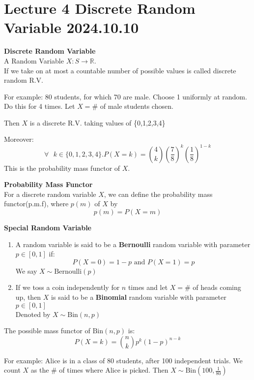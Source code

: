 \documentclass{article}
\begin{document}
\section{Lecture 4 Discrete Random Variable 2024.10.10}

\begin{definition}
    \textbf{Discrete Random Variable}\\
    A Random Variable $ X: S \longrightarrow \mathbb{R}$.\\
    If we take on at most a countable number of possible values is called discrete random R.V.
\end{definition}
For example: 80 students, for which 70 are male. Choose 1 uniformly at random. Do this for 4 times. Let $X = \#$ of male students chosen.

Then $X$ is a discrete R.V. taking values of \{0,1,2,3,4\}

Moreover:
$$\forall \text{ } k \in \{0,1,2,3,4\}. P(X=k) = \binom{4}{k}(\frac{7}{8})^k(\frac{1}{8})^{1-k}$$
This is the probability mass functor of $X$.
\begin{definition}
    \textbf{Probability Mass Functor}\\
    For a discrete random variable $X$, we can define the probability mass functor(p.m.f), where $p(m)$ of $X$ by
    $$ p(m) = P(X=m)$$
\end{definition}

\begin{definition}
    
    \textbf{Special Random Variable}
    \begin{enumerate}
        \item A random variable is said to be a \textbf{Bernoulli} random variable with parameter $p \in [0,1]$ if: 
        $$ P(X=0) = 1 - p \text{ and } P(X = 1) = p $$
        We say $ X \sim \text{Bernoulli}(p)$
        \item If we toss a coin independently for $n$ times and let $X = \#$ of heads coming up, then $X$ is said to be a \textbf{Binomial} random variable with parameter $p \in [0,1]$\\
        Denoted by $X \sim \text{Bin}(n,p)$
    \end{enumerate}
    
\end{definition}
The possible mass functor of $\text{Bin}(n,p)$ is:
$$ P(X=k) = \binom{n}{k}p^k(1-p)^{n-k}$$

For example: Alice is in a class of 80 students, after 100 independent trials. We count $X$ as the \# of times where Alice is picked. Then $X \sim \text{Bin}(100, \frac{1}{80})$
\end{document}

